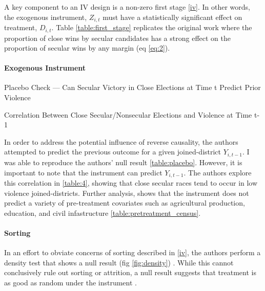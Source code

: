 \documentclass{scrartcl}
\begin{document}
A key component to an IV design is a non-zero first stage \ref{iv}. In other words, the exogenous instrument, $Z_{i,t}$ must have a statistically significant effect on treatment, $D_{i,t}$.
Table \ref{table:first_stage} replicates the original work where the proportion of close wins by secular candidates has a strong effect on the proportion of secular wins by any margin (eq \ref{eq:2}).


\paragraph{Exogenous Instrument} \label{exo}
\begin{table}[ht]
  \begin{center}
    \scalebox{0.75}{
      
    }
    \caption{Placebo Check — Can Secular Victory in Close Elections at Time t Predict Prior Violence}
    \label{table:placebo}
  \end{center}
\end{table}
\begin{table}[ht]
  \begin{center}
    \scalebox{0.75}{
      
    }
    \caption{Correlation Between Close Secular/Nonsecular Elections and Violence at Time t-1}
    \label{table:4}
  \end{center}
\end{table}

In order to address the potential influence of reverse causality, the authors attempted to predict the previous outcome for a given joined-district $Y_{i,t-1}$.
I was able to reproduce the authors' null result \ref{table:placebo}.
However, it is important to note that the instrument can predict $Y_{i,t-1}$.
The authors explore this correlation in \ref{table:4}, showing that close secular races tend to occur in low violence joined-districts.
Further analysis, shows that the instrument does not predict a variety of pre-treatment covariates such as agricultural production, education, and civil infastructure \ref{table:pretreatment_census}.

\paragraph{Sorting}


In an effort to obviate concerns of sorting described in \ref{iv}, the authors perform a density test that shows a null result (fig \ref{fig:density}) \cite{mccrary_2008}.
While this cannot conclusively rule out sorting or attrition, a null result suggests that treatment is as good as random under the instrument \cite{Cataneo_2019}. 
\end{document}
